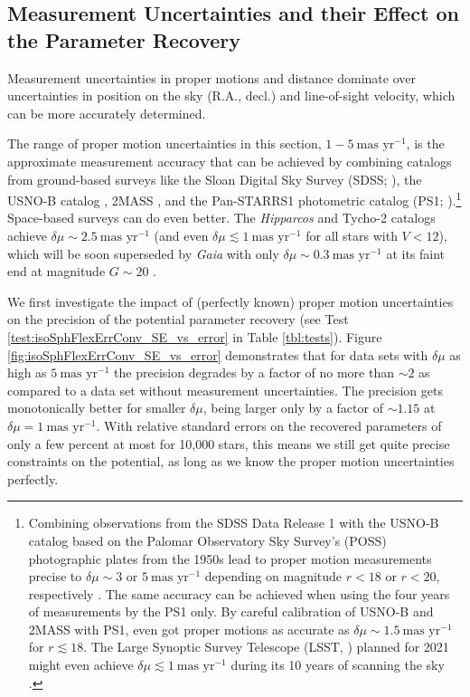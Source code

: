 \documentclass[iop,revtex4,numberedappendix,appendixfloats]{emulateapj}
\begin{document}
\subsection{Measurement Uncertainties and their Effect on the Parameter Recovery} \label{sec:results_errors}

Measurement uncertainties in proper motions and distance dominate over uncertainties in position on the sky (R.A., decl.) and line-of-sight velocity, which can be more accurately determined.

The range of proper motion uncertainties in this section, $1-5~\text{mas yr}^{-1}$, is the approximate measurement accuracy that can be achieved by combining catalogs from ground-based surveys like the Sloan Digital Sky Survey (SDSS; \citealt{2003AJ....126.2081A}), the USNO-B catalog \citep{2003AJ....125..984M}, 2MASS \citep{2006AJ....131.1163S}, and the Pan-STARRS1 photometric catalog (PS1; \citealt{2010SPIE.7733E..0EK}).\footnote{Combining observations from the SDSS Data Release 1 with the USNO-B catalog based on the Palomar Observatory Sky Survey's (POSS) photographic plates from the 1950s lead to proper motion measurements precise to $\delta\mu\sim3$ or $5~\text{mas yr}^{-1}$ depending on magnitude $r<18$ or $r<20$, respectively \citep{2004ApJS..152..103G,2004AJ....127.3034M,2008AJ....136..895M}. The same accuracy can be achieved when using the four years of measurements by the PS1 only. By careful calibration of USNO-B and 2MASS with PS1, \citet{2015ApJ...809...59S} even got proper motions as accurate as $\delta \mu\sim1.5~\text{mas yr}^{-1}$ for $r\lesssim 18$. The Large Synoptic Survey Telescope (LSST, \citealt{2008arXiv0805.2366I}) planned for 2021 might even achieve $\delta\mu \lesssim 1~\text{mas yr}^{-1}$ during its 10 years of scanning the sky \citep{2008IAUS..248..537I}.} Space-based surveys can do even better. The \emph{Hipparcos} \citep{1997ESASP1200.....E} and Tycho-2 \citep{2000A&A...355L..27H} catalogs achieve $\delta \mu\sim2.5~\text{mas yr}^{-1}$ (and even $\delta\mu \lesssim 1~\text{mas yr}^{-1}$ for all stars with $V <12$), which will be soon superseded by \emph{Gaia} with only $\delta \mu\sim0.3~\text{mas yr}^{-1}$ at its faint end at magnitude $G\sim20$ \citep{2014EAS....67...23D}.

We first investigate the impact of (perfectly known) proper motion uncertainties on the precision of the potential parameter recovery (see Test \ref{test:isoSphFlexErrConv_SE_vs_error} in Table \ref{tbl:tests}). Figure \ref{fig:isoSphFlexErrConv_SE_vs_error} demonstrates that for data sets with $\delta \mu$ as high as $5~\text{mas yr}^{-1}$ the precision degrades by a factor of no more than $\sim2$ as compared to a data set without measurement uncertainties. The precision gets monotonically better for smaller $\delta \mu$, being larger only by a factor of $\sim 1.15$ at $\delta \mu=1~\text{mas yr}^{-1}$. With relative standard errors on the recovered parameters of only a few percent at most for 10,000 stars, this means we still get quite precise constraints on the potential, as long as we know the proper motion uncertainties perfectly.
\end{document}
